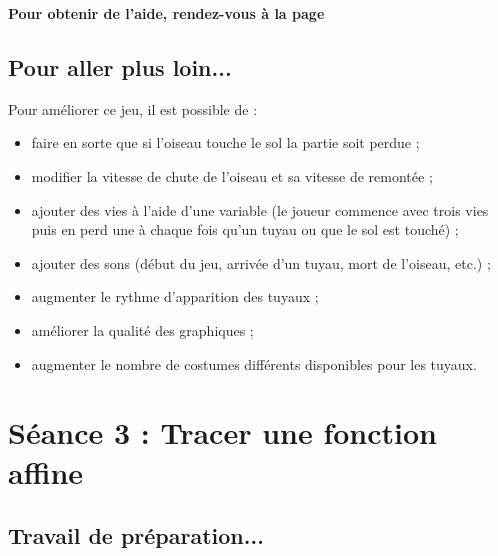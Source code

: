 


\textbf{Pour obtenir de l'aide, rendez-vous à la page \pageref{aide_seanceScratch2}}



\subsection{Pour aller plus loin...}

Pour améliorer ce jeu, il est possible de :

\begin{itemize}
\item faire en sorte que si l'oiseau touche le sol la partie soit perdue ;
\item modifier la vitesse de chute de l'oiseau et sa vitesse de remontée ; 
\item ajouter des vies à l'aide d'une variable (le joueur commence avec trois vies puis en perd une à chaque fois qu'un tuyau ou que le sol est touché) ;
\item ajouter des sons (début du jeu, arrivée d'un tuyau, mort de l'oiseau, etc.) ;
\item augmenter le rythme d'apparition des tuyaux ; 
\item améliorer la qualité des graphiques ;
\item augmenter le nombre de costumes différents disponibles pour les tuyaux. 
\end{itemize}







%
%
%
%

\newpage

\section{Séance 3 : Tracer une fonction affine}\label{ficheScratch4e3}

\subsection{Travail de préparation...}

